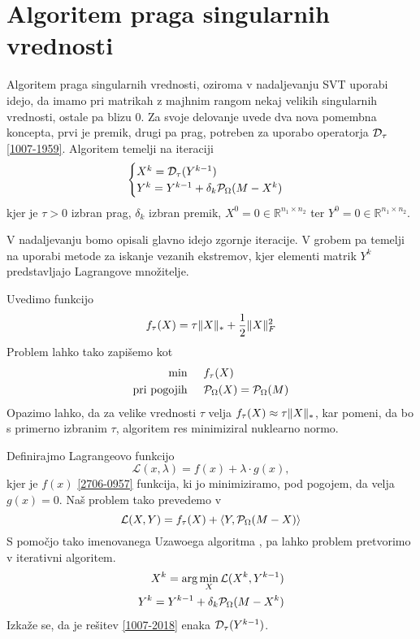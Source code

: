 \section{Algoritem praga singularnih vrednosti}
Algoritem praga singularnih vrednosti, oziroma v nadaljevanju SVT uporabi idejo, da imamo pri matrikah z majhnim rangom nekaj velikih singularnih vrednosti, ostale pa blizu 0. Za svoje delovanje uvede dva nova pomembna koncepta, prvi je premik, drugi pa prag, potreben za uporabo operatorja $\mathcal{D}_\tau$ \eqref{1007-1959}. Algoritem temelji na iteraciji
\[
    \begin{cases}
        X^k = \mathcal{D}_\tau(Y^{k-1}) \\
        Y^k = Y^{k-1} + \delta_k \mathcal{P}_\Omega(M - X^k) 
    \end{cases}
\]
kjer je $\tau > 0$ izbran prag, $\delta_k$ izbran premik, $X^0 = 0 \in \mathbb{R}^{n_1 \times n_2}$ ter
$Y^0 = 0 \in \mathbb{R}^{n_1 \times n_2}$. \cite{CCS}

V nadaljevanju bomo opisali glavno idejo zgornje iteracije. V grobem pa temelji na uporabi metode za iskanje vezanih ekstremov, kjer elementi matrik $Y^k$ predstavljajo Lagrangove množitelje. 

Uvedimo funkcijo 
\begin{align}
    \label{1007-2007}
    f_\tau(X) = \tau\lVert X\rVert_* + \frac{1}{2}\lVert X\rVert_F^2
\end{align}
Problem lahko tako zapišemo kot 
\begin{align}
\label{2706-0957}
\begin{split}
    \textrm{min} & \hspace{0.5cm} f_\tau(X) \\
    \textrm{pri pogojih} & \hspace{0.5cm} \mathcal{P}_\Omega(X) = \mathcal{P}_\Omega(M)
\end{split}
\end{align}
Opazimo lahko, da za velike vrednosti $\tau$ velja $f_\tau(X) \approx \tau\lVert X\rVert_*$, kar pomeni, da bo s primerno izbranim $\tau$, algoritem res minimiziral nuklearno normo.

Definirajmo Lagrangeovo funkcijo 
\[\mathcal{L}(x, \lambda) = f(x) + \lambda \cdot g(x),\]
kjer je $f(x)$ \eqref{2706-0957} funkcija, ki jo minimiziramo, pod pogojem, da velja $g(x) = 0$. Naš problem tako prevedemo v
\[
    \mathcal{L}(X, Y) = f_\tau(X) + \left< Y, \mathcal{P}_\Omega(M - X) \right>
\] 
S pomočjo tako imenovanega Uzawoega algoritma \cite{CCS}, pa lahko problem pretvorimo v iterativni algoritem. 
\begin{align}
        X^k =  \arg \min_{X} \mathcal{L}(X^k, Y^{k-1}) \label{1007-2018}\\
        Y^k = Y^{k-1} + \delta_k \mathcal{P}_\Omega(M - X^k) \label{1007-2019}
\end{align}
Izkaže se, da je rešitev \eqref{1007-2018} enaka $\mathcal{D}_\tau(Y^{k-1})$.


